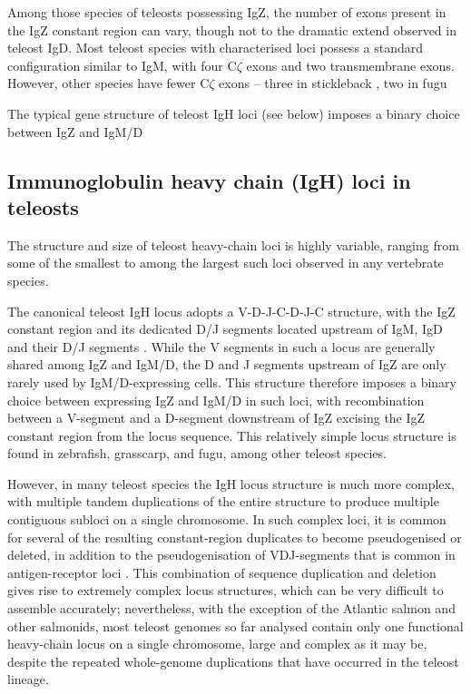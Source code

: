 Among those species of teleosts possessing IgZ, the number of exons present in the IgZ constant region can vary, though not to the dramatic extend observed in teleost IgD. Most teleost species with characterised loci possess a standard configuration similar to IgM, with four C$\zeta$ exons and two transmembrane exons. However, other species have fewer C$\zeta$ exons -- three in stickleback %
, two in fugu %

The typical gene structure of teleost IgH loci (see below) imposes a binary choice between IgZ and IgM/D 

\subsection{Immunoglobulin heavy chain (IgH) loci in teleosts}

The structure and size of teleost heavy-chain loci is highly variable, ranging from some of the smallest to among the largest such loci observed in any vertebrate species.

The canonical teleost IgH locus adopts a V-D-J-C-D-J-C structure, with the IgZ constant region and its dedicated D/J segments located upstream of IgM, IgD and their D/J segments \citep{fillatreau2013astonishing}. %
While the V segments in such a locus are generally shared among IgZ and IgM/D, the D and J segments upstream of IgZ are only rarely used by IgM/D-expressing cells.
This structure therefore imposes a binary choice between expressing IgZ and IgM/D in such loci, with recombination between a V-segment and a D-segment downstream of IgZ excising the IgZ constant region from the locus sequence. This relatively simple locus structure is found in zebrafish, grasscarp, and fugu, among other teleost species. %

However, in many teleost species the IgH locus structure is much more complex, with multiple tandem duplications of the entire structure to produce multiple contiguous subloci on a single chromosome. In such complex loci, it is common for several of the resulting constant-region duplicates to become pseudogenised or deleted, in addition to the pseudogenisation of VDJ-segments that is common in antigen-receptor loci %
. This combination of sequence duplication and deletion gives rise to extremely complex locus structures, which can be very difficult to assemble accurately; nevertheless, with the exception of the Atlantic salmon and other salmonids, most teleost genomes so far analysed contain only one functional heavy-chain locus on a single chromosome, large and complex as it may be, despite the repeated whole-genome duplications that have occurred in the teleost lineage.


